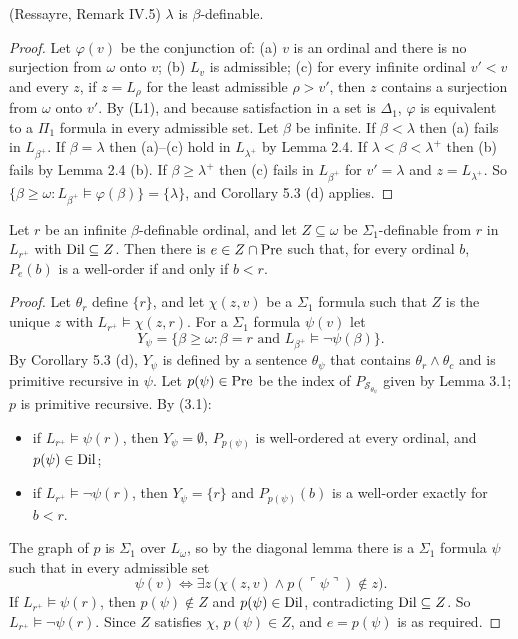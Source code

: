 \documentclass[11pt]{article}
\begin{document}
\begin{statement} (Ressayre, Remark IV.5) $\lambda$ is $\beta$-definable.
\end{statement}

\begin{proof} Let $\varphi(v)$ be the conjunction of: (a) $v$ is an ordinal and there is no surjection from
$\omega$ onto $v$; (b) $L_v$ is admissible; (c) for every infinite ordinal $v' < v$ and every $z$, if $z = L_\rho$
for the least admissible $\rho > v'$, then $z$ contains a surjection from $\omega$ onto $v'$. By (L1), and because
satisfaction in a set is $\Delta_1$, $\varphi$ is equivalent to a $\Pi_1$ formula in every admissible set. Let
$\beta$ be infinite. If $\beta < \lambda$ then (a) fails in $L_{\beta^+}$. If $\beta = \lambda$ then (a)--(c) hold in
$L_{\lambda^+}$ by Lemma 2.4. If $\lambda < \beta < \lambda^+$ then (b) fails by Lemma 2.4 (b). If $\beta \ge \lambda^+$ then (c) fails in
$L_{\beta^+}$ for $v' = \lambda$ and $z = L_{\lambda^+}$. So $\{\beta \ge \omega : L_{\beta^+} \models \varphi(\beta)\} = \{\lambda\}$,
and Corollary 5.3 (d) applies.
\end{proof}

\begin{statement} Let $r$ be an infinite $\beta$-definable ordinal, and let $Z \subseteq \omega$ be
$\Sigma_1$-definable from $r$ in $L_{r^+}$ with $\mathrm{Dil} \subseteq Z$. Then there is $e \in Z \cap \mathrm{Pre}$ such that, for
every ordinal $b$, $P_e(b)$ is a well-order if and only if $b < r$.
\end{statement}

\begin{proof} Let $\theta_r$ define $\{r\}$, and let $\chi(z, v)$ be a $\Sigma_1$ formula such that $Z$ is the
unique $z$ with $L_{r^+} \models \chi(z, r)$. For a $\Sigma_1$ formula $\psi(v)$ let
\[ Y_\psi = \{\beta \ge \omega : \beta = r \text{ and } L_{\beta^+} \models \neg\psi(\beta)\} . \]
By Corollary 5.3 (d), $Y_\psi$ is defined by a sentence $\theta_\psi$ that contains $\theta_r \wedge \theta_c$ and is primitive recursive in $\psi$. Let
$p(\psi) \in \mathrm{Pre}$ be the index of $P_{\mathcal S_{\theta_\psi}}$ given by Lemma 3.1; $p$ is primitive recursive.
By (3.1):
\begin{itemize}
\item if $L_{r^+} \models \psi(r)$, then $Y_\psi = \emptyset$, $P_{p(\psi)}$ is well-ordered at every ordinal, and
  $p(\psi) \in \mathrm{Dil}$;
\item if $L_{r^+} \models \neg\psi(r)$, then $Y_\psi = \{r\}$ and $P_{p(\psi)}(b)$ is a well-order exactly for
  $b < r$.
\end{itemize}
The graph of $p$ is $\Sigma_1$ over $L_{\omega}$, so by the diagonal lemma there is a $\Sigma_1$ formula $\psi$ such
that in every admissible set
\[ \psi(v) \iff \exists z\, \bigl(\chi(z, v) \wedge p(\ulcorner\psi\urcorner) \notin z\bigr) . \]
If $L_{r^+} \models \psi(r)$, then $p(\psi) \notin Z$ and $p(\psi) \in \mathrm{Dil}$, contradicting $\mathrm{Dil} \subseteq Z$. So
$L_{r^+} \models \neg\psi(r)$. Since $Z$ satisfies $\chi$, $p(\psi) \in Z$, and $e = p(\psi)$ is as required.
\end{proof}
\end{document}
